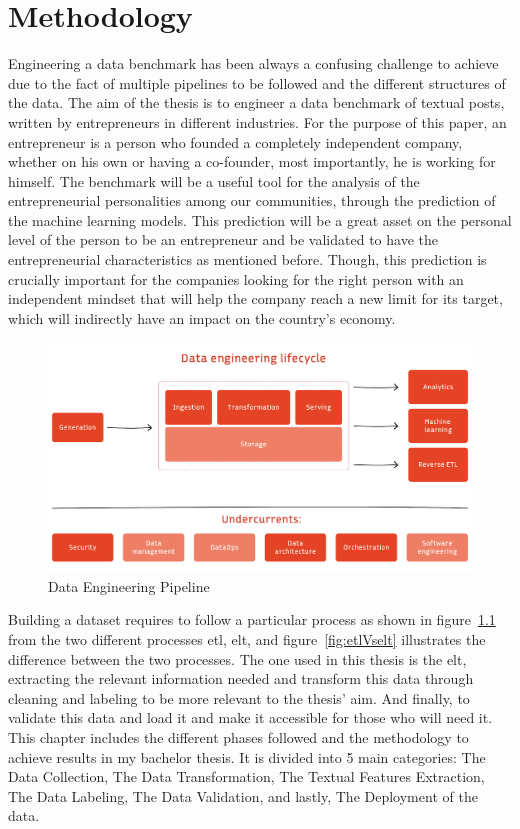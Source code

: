 \chapter{Methodology}
\label{chap:method}
Engineering a data benchmark has been always a confusing challenge to achieve due to the fact of multiple pipelines to be followed and the different structures of the data. The aim of the thesis is to engineer a data benchmark of textual posts, written by entrepreneurs in different industries. For the purpose of this paper, an entrepreneur is a person who founded a completely independent company, whether on his own or having a co-founder, most importantly, he is working for himself. The benchmark will be a useful tool for the analysis of the entrepreneurial personalities among our communities, through the prediction of the machine learning models. This prediction will be a great asset on the personal level of the person to be an entrepreneur and be validated to have the entrepreneurial characteristics as mentioned before. Though, this prediction is crucially important for the companies looking for the right person with an independent mindset that will help the company reach a new limit for its target, which will indirectly have an impact on the country's economy.

\begin{figure}[H]
\centering
\includegraphics[width=13cm]{datalifecycle}
\caption{Data Engineering Pipeline \cite{Redpanda}}
\label{fig:DataPipelineArchitecture}
\end{figure}

Building a dataset requires to follow a particular process as shown in figure~\ref{fig:DataPipelineArchitecture} from the two different processes \ac{etl}, \ac{elt}, and figure~\ref{fig:etlVselt} illustrates the difference between the two processes. The one used in this thesis is the \ac{elt}, extracting the relevant information needed and transform this data through cleaning and labeling to be more relevant to the thesis' aim. And finally, to validate this data and load it and make it accessible for those who will need it. This chapter includes the different phases followed and the methodology to achieve results in my bachelor thesis. It is divided into 5 main categories: The Data Collection, The Data Transformation, The Textual Features Extraction, The Data Labeling, The Data Validation, and lastly, The Deployment of the data.

